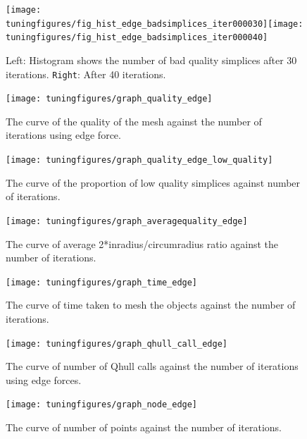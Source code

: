\documentclass[10pt,a4paper]{book}
\begin{document}
\begin{figure}[tbhp]
\centerline{\texttt{[image: tuningfigures/fig\_hist\_edge\_badsimplices\_iter000030]}\hspace{3cm}\texttt{[image: tuningfigures/fig\_hist\_edge\_badsimplices\_iter000040]}}
\caption{\label{fig:fig_hist_edge_badsimplices_iter000040:} Left: Histogram shows the number of bad quality simplices after 30 iterations. \texttt{Right}: After 40 iterations.}
\end{figure}

\begin{figure}[tbhp]
\centerline{\texttt{[image: tuningfigures/graph\_quality\_edge]}}
\caption{\label{fig:graph_quality_edge} The curve of the quality of the mesh against the number of iterations using edge force.}
\end{figure}

\begin{figure}[tbhp]
\centerline{\texttt{[image: tuningfigures/graph\_quality\_edge\_low\_quality]}}
\caption{\label{fig:graph_quality_edge_low_quality} The curve of the proportion of low quality simplices against number of iterations.}
\end{figure}


\begin{figure}[tbhp]
\centerline{\texttt{[image: tuningfigures/graph\_averagequality\_edge]}}
\caption{\label{fig:graph_averagequality_edge} The curve of average 2*inradius/circumradius ratio against the number of iterations.}
\end{figure}


\begin{figure}[tbhp]
\centerline{\texttt{[image: tuningfigures/graph\_time\_edge]}}
\caption{\label{fig:graph_time_edge} The curve of time taken to mesh the objects against the number of iterations.}
\end{figure}

\begin{figure}[tbhp]
\centerline{\texttt{[image: tuningfigures/graph\_qhull\_call\_edge]}}
\caption{\label{fig:graph_qhull_call_edge} The curve of number of Qhull calls against the number of iterations using edge forces.}
\end{figure}


\begin{figure}[tbhp]
\centerline{\texttt{[image: tuningfigures/graph\_node\_edge]}}
\caption{\label{fig:iterationnumpoints} The curve of number of points against the number of iterations.}
\end{figure}
\end{document}
